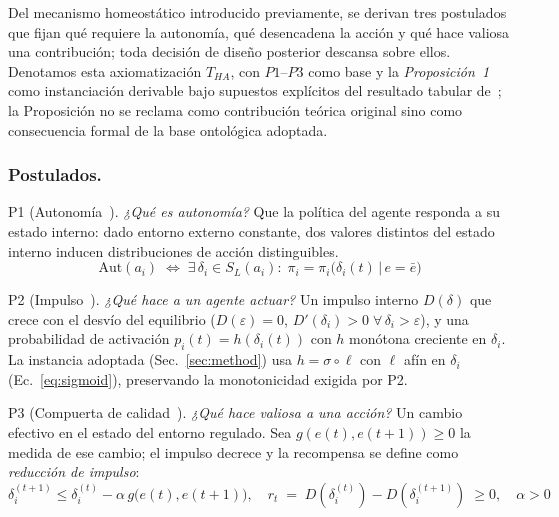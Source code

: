 \documentclass{llncs}
\begin{document}
Del mecanismo homeost\'atico introducido previamente, se derivan tres
postulados que fijan qu\'e requiere la autonom\'ia, qu\'e desencadena la
acci\'on y qu\'e hace valiosa una contribuci\'on; toda decisi\'on de
dise\~no posterior descansa sobre ellos. Denotamos esta axiomatizaci\'on
$T_{HA}$, con $P1$--$P3$ como base y la \emph{Proposici\'on~1} como
instanciaci\'on derivable bajo supuestos expl\'icitos del resultado
tabular de~\textcite{keramati2014homeostatic}; la Proposici\'on no se
reclama como contribuci\'on te\'orica original sino como consecuencia
formal de la base ontol\'ogica adoptada.

\subsubsection{Postulados.}

\noindent\textsc{P1} (Autonom\'ia~\parencite{ashby1956introduction,beer1972brain}).
\emph{¿Qu\'e es autonom\'ia?} Que la pol\'itica del agente responda a
su estado interno: dado entorno externo constante, dos valores
distintos del estado interno inducen distribuciones de acci\'on
distinguibles.
\begin{equation}
    \mathrm{Aut}(a_i) \;\iff\; \exists\,\delta_i \in S_L(a_i):\;
    \pi_i = \pi_i\!\bigl(\delta_i(t) \,\big|\, e=\bar e\bigr)
    \label{eq:a1}
\end{equation}

\noindent\textsc{P2} (Impulso~\parencite{sterling1988allostasis}).
\emph{¿Qu\'e hace a un agente actuar?} Un impulso interno
$D(\delta)$ que crece con el desv\'io del equilibrio
($D(\varepsilon)=0$, $D'(\delta_i)>0\;\forall\,\delta_i>\varepsilon$),
y una probabilidad de activaci\'on $p_i(t)=h(\delta_i(t))$ con $h$
mon\'otona creciente en $\delta_i$. La instancia adoptada
(Sec.~\ref{sec:method}) usa $h=\sigma\!\circ\!\ell$ con $\ell$ af\'in
en $\delta_i$ (Ec.~\ref{eq:sigmoid}), preservando la monotonicidad
exigida por P2.

\noindent\textsc{P3} (Compuerta de calidad~\parencite{ryan2001happiness}).
\emph{¿Qu\'e hace valiosa a una acci\'on?} Un cambio efectivo en el
estado del entorno regulado. Sea $g(e(t),e(t{+}1))\geq 0$ la medida de
ese cambio; el impulso decrece y la recompensa se define como
\emph{reducci\'on de impulso}:
\begin{equation}
    \delta_i^{(t+1)} \le \delta_i^{(t)} - \alpha\, g\!\bigl(e(t), e(t{+}1)\bigr),
    \quad r_t \;=\; D(\delta_i^{(t)}) - D(\delta_i^{(t+1)}) \;\ge 0,
    \quad \alpha > 0
    \label{eq:a3}
\end{equation}
\end{document}
